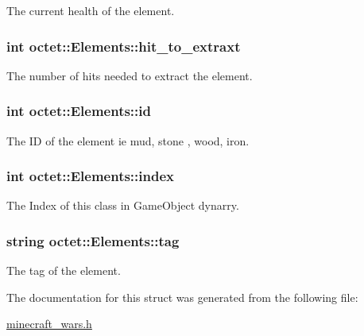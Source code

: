 The current health of the element. 

\hypertarget{structoctet_1_1_elements_a33a93377f7814a339d0b4bc0d8200c02}{
\subsubsection[{hit\+\_\+to\+\_\+extraxt}]{\setlength{\rightskip}{0pt plus 5cm}int octet\+::\+Elements\+::hit\+\_\+to\+\_\+extraxt}}\label{structoctet_1_1_elements_a33a93377f7814a339d0b4bc0d8200c02}


The number of hits needed to extract the element. 

\hypertarget{structoctet_1_1_elements_ad7862925baea3ff467671233e86c6584}{
\subsubsection[{id}]{\setlength{\rightskip}{0pt plus 5cm}int octet\+::\+Elements\+::id}}\label{structoctet_1_1_elements_ad7862925baea3ff467671233e86c6584}


The I\+D of the element ie mud, stone , wood, iron. 

\hypertarget{structoctet_1_1_elements_a8d2c5872a3c685832f767505c85cf7e3}{
\subsubsection[{index}]{\setlength{\rightskip}{0pt plus 5cm}int octet\+::\+Elements\+::index}}\label{structoctet_1_1_elements_a8d2c5872a3c685832f767505c85cf7e3}


The Index of this class in Game\+Object dynarry. 

\hypertarget{structoctet_1_1_elements_ad7bb712671fd59dfce732441b15ed6e9}{
\subsubsection[{tag}]{\setlength{\rightskip}{0pt plus 5cm}string octet\+::\+Elements\+::tag}}\label{structoctet_1_1_elements_ad7bb712671fd59dfce732441b15ed6e9}


The tag of the element. 



The documentation for this struct was generated from the following file\+:\begin{DoxyCompactItemize}
\item 
\hyperlink{minecraft__wars_8h}{minecraft\+\_\+wars.\+h}\end{DoxyCompactItemize}
